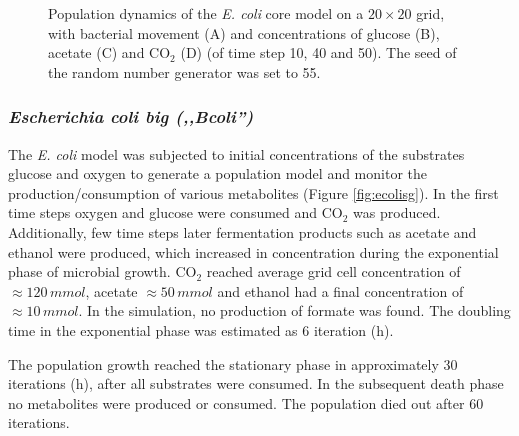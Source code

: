 \begin{figure}[h!]
{\begin{minipage}[t]{0.3\textwidth}
  \end{minipage}
  }
  \caption{Population dynamics of the \emph{E. coli} core model on a $20\times20$ grid, with bacterial movement (A) and concentrations of glucose (B), acetate (C) and CO$_2$ (D) (of time step 10, 40 and 50). The seed of the random number generator was set to 55.}
  \label{fig:ecoregrids}
\end{figure}

\subsubsection{\textit{Escherichia coli big (,,Bcoli'')}}
\label{Bcoli}
The \textit{E. coli} model was subjected to initial concentrations of the substrates glucose and oxygen to generate a population model and monitor the production/consumption of various metabolites (Figure \hyperref[fig:ecolisg]{\ref{fig:ecolisg}}). In the first time steps oxygen and glucose were consumed and CO$_2$ was produced. Additionally, few time steps later fermentation products such as acetate and ethanol were produced, which increased in concentration during the exponential phase of microbial growth. 
CO$_2$ reached average grid cell concentration of $\approx 120\, mmol$, acetate $\approx 50\, mmol$ and ethanol had a final concentration of $\approx 10\,mmol$.
In the simulation, no production of formate was found. The doubling time in the exponential phase was estimated as 6 iteration (h).

The population growth reached the stationary phase in approximately 30 iterations (h), after all substrates were consumed. In the subsequent death phase no metabolites were produced or consumed. The population died out after 60 iterations.


